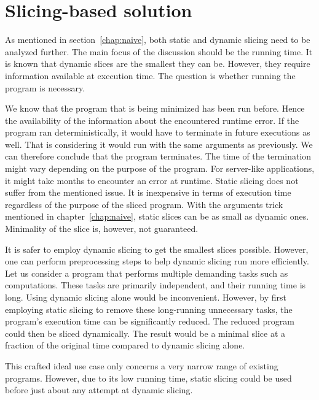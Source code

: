 \section{Slicing-based solution}

As mentioned in section~\ref{chap:naive}, both static and dynamic slicing 
need to be analyzed further.
The main focus of the discussion should be the running time.
It is known that dynamic slices are the smallest they can be.
However, they require information available at execution time.
The question is whether running the program is necessary.

We know that the program that is being minimized has been run before.
Hence the availability of the information about the encountered runtime 
error.
If the program ran deterministically, it would have to terminate in future 
executions as well.
That is considering it would run with the same arguments as previously.
We can therefore conclude that the program terminates.
The time of the termination might vary depending on the purpose of 
the program.
For server-like applications, it might take months to encounter an error 
at runtime.
Static slicing does not suffer from the mentioned issue.
It is inexpensive in terms of execution time regardless of the purpose 
of the sliced program.
With the arguments trick mentioned in chapter~\ref{chap:naive}, 
static slices can be as small as dynamic ones.
Minimality of the slice is, however, not guaranteed.

It is safer to employ dynamic slicing to get the smallest slices possible.
However, one can perform preprocessing steps to help dynamic slicing run more 
efficiently.
Let us consider a program that performs multiple demanding tasks 
such as computations.
These tasks are primarily independent, and their running time is long.
Using dynamic slicing alone would be inconvenient.
However, by first employing static slicing to remove these long-running 
unnecessary tasks, the program's execution time can be significantly reduced.
The reduced program could then be sliced dynamically.
The result would be a minimal slice at a fraction of the original time 
compared to dynamic slicing alone.

This crafted ideal use case only concerns a very narrow range of existing 
programs.
However, due to its low running time, static slicing could be used before 
just about any attempt at dynamic slicing.


